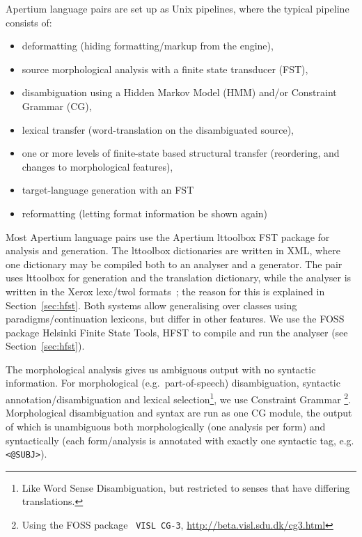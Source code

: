 \documentclass{book}
\begin{document}
Apertium language pairs are set up as Unix pipelines, where the
typical pipeline consists of:

\begin{itemize}
\item deformatting (hiding formatting/markup from the engine),
\item source morphological analysis with a finite state transducer
  (FST),
\item disambiguation using a Hidden Markov Model (HMM) and/or
  Constraint Grammar (CG), 
\item lexical transfer (word-translation on the disambiguated source),
\item one or more levels of finite-state based structural transfer
  (reordering, and changes to morphological features),
\item target-language generation with an FST
\item reformatting (letting format information be shown again)
\end{itemize}

Most Apertium language pairs use the Apertium lttoolbox FST package
for analysis and generation. The lttoolbox dictionaries are written in
XML, where one dictionary may be compiled both to an analyser and a
generator. The \smenob{} pair uses lttoolbox for \nob{} generation and
the translation dictionary, while the \sme{} analyser is written in
the Xerox lexc/twol formats~\citep{beesley2003fsm}; the reason for
this is explained in Section~\ref{sec:hfst}. Both systems allow
generalising over classes using paradigms/continuation lexicons, but
differ in other features. We use the FOSS package Helsinki Finite
State Tools, HFST \citep{linden2011hfst} to compile and run the
analyser (see Section~\ref{sec:hfst}).

The morphological analysis gives us ambiguous output with no syntactic
information. For morphological (e.g.~part-of-speech) disambiguation,
syntactic annotation/disambiguation and lexical
selection\footnote{Like Word Sense Disambiguation, but restricted to
  senses that have differing translations.}, we use Constraint Grammar
\citep{karlsson1990cgf}\footnote{Using the FOSS package {\tt \small
    VISL CG-3},
  \href{http://beta.visl.sdu.dk/cg3.html}{http://beta.visl.sdu.dk/cg3.html}}.
Morphological disambiguation and syntax are run as one CG module, the
output of which is unambiguous both morphologically (one analysis per
form) and syntactically (each form/analysis is annotated with exactly
one syntactic tag, e.g. \texttt{<@SUBJ>}).
\end{document}
